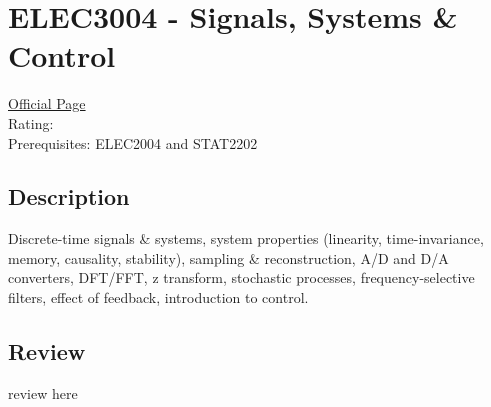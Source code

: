 \hypertarget{ELEC3004}{\section{ELEC3004 - Signals, Systems \& Control}}

\large
\textcolor{turbo_purple}{\href{https://my.uq.edu.au/programs-courses/course.html?course_code=ELEC3004}{Official Page}} \\
Rating: \cstar\cstar\cstar\cstar\ostar \\
Prerequisites: ELEC2004 and STAT2202

\normalsize
\subsection*{Description}
Discrete-time signals \& systems, system properties (linearity, time-invariance, memory, causality, stability), sampling \& reconstruction, A/D and D/A converters, DFT/FFT, z transform, stochastic processes, frequency-selective filters, effect of feedback, introduction to control.

\subsection*{Review}
review here
